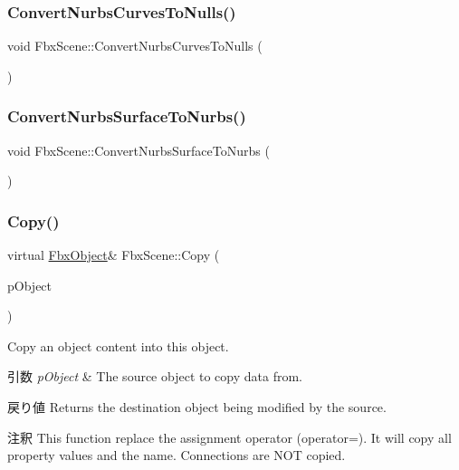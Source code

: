 \mbox{\label{class_fbx_scene_a9d1fed2b6c643ff2a091928ff8b8b634}} 
\subsubsection{\texorpdfstring{Convert\+Nurbs\+Curves\+To\+Nulls()}{ConvertNurbsCurvesToNulls()}}
{\footnotesize\ttfamily void Fbx\+Scene\+::\+Convert\+Nurbs\+Curves\+To\+Nulls (\begin{DoxyParamCaption}{ }\end{DoxyParamCaption})}

\mbox{\label{class_fbx_scene_abf1c255ce53d570ce7038154c6194f1a}} 
\subsubsection{\texorpdfstring{Convert\+Nurbs\+Surface\+To\+Nurbs()}{ConvertNurbsSurfaceToNurbs()}}
{\footnotesize\ttfamily void Fbx\+Scene\+::\+Convert\+Nurbs\+Surface\+To\+Nurbs (\begin{DoxyParamCaption}{ }\end{DoxyParamCaption})}

\mbox{\label{class_fbx_scene_ab78703621f17898a3caf23b589821609}} 
\subsubsection{\texorpdfstring{Copy()}{Copy()}}
{\footnotesize\ttfamily virtual \hyperlink{class_fbx_object}{Fbx\+Object}\& Fbx\+Scene\+::\+Copy (\begin{DoxyParamCaption}\item[{const \hyperlink{class_fbx_object}{Fbx\+Object} \&}]{p\+Object }\end{DoxyParamCaption})\hspace{0.3cm}{\ttfamily [virtual]}}

Copy an object content into this object. 
\begin{DoxyParams}{引数}
{\em p\+Object} & The source object to copy data from. \\
\hline
\end{DoxyParams}
\begin{DoxyReturn}{戻り値}
Returns the destination object being modified by the source. 
\end{DoxyReturn}
\begin{DoxyRemark}{注釈}
This function replace the assignment operator (operator=). It will copy all property values and the name. Connections are N\+OT copied. 
\end{DoxyRemark}


